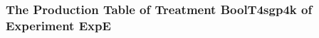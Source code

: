  \begin{frame}
 \fontsize{8pt}{9pt}\selectfont
 \frametitle{ The Production Table of Treatment BoolT4sgp4k of Experiment ExpE }

 \label{ExpEGrammarTable003.tex}  
 \end{frame}

